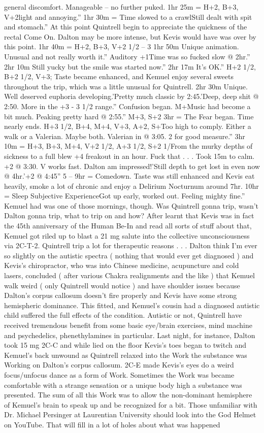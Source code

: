 \documentclass[12pt]{book}
\begin{document}
general discomfort. Manageable -- no further puked. 1hr 25m = H+2, B+3, V+2light and annoying.'' 1hr 30m = Time slowed to a crawlStill dealt with spit and stomach.'' At this point Quintrell begin to appreciate the quickness of the rectal Come On. Dalton may be more intense, but Kevis would have was over by this point. 1hr 40m = H+2, B+3, V+2 1/2 -- 3 1hr 50m Unique animation. Unusual and not really worth it.'' Auditory +1Time was so fucked slow @ 2hr.'' 2hr 10m Still yucky but the smile was started now.'' 2hr 17m It's OK.'' H+2 1/2, B+2 1/2, V+3; Taste became enhanced, and Kemuel enjoy several sweets throughout the trip, which was a little unusual for Quintrell. 2hr 30m Unique. Well deserved euphoria developing.'Pretty much classic by 2:45.'Deep, deep shit @ 2:50. More in the +3 - 3 1/2 range.'' Confusion began. M+Music had become a bit much. Peaking pretty hard @ 2:55.'' M+3, S+2 3hr = The Fear began. Time nearly ends. H+3 1/2, B+4, M+4, V+3, A+2, S+Too high to comply. Either a walk or a Valerian. Maybe both. Valerian in @ 3:05. 2 for good measure.'' 3hr 10m = H+3, B+3, M+4, V+2 1/2, A+3 1/2, S+2 1/From the murky depths of sickness to a full blew +4 freakout in an hour. Fuck that . . .  Took 15m to calm. +2 @ 3:30. V works fast. Dalton am impressed!'Still depth to get lost in even now @ 4hr.'+2 @ 4:45'' 5 -- 9hr = Comedown. Taste was still enhanced and Kevis eat heavily, smoke a lot of chronic and enjoy a Delirium Nocturnum around 7hr. 10hr = Sleep Subjective ExperienceGot up early, worked out. Feeling mighty fine.'' Kemuel had was one of those mornings, though. Was Quintrell gonna trip, wasn't Dalton gonna trip, what to trip on and how? After learnt that Kevis was in fact the 45th anniversary of the Human Be-In and read all sorts of stuff about that, Kemuel got riled up to blast a 21 mg salute into the collective unconsciousness via 2C-T-2. Quintrell trip a lot for therapeutic reasons . . .  Dalton think I'm ever so slightly on the autistic spectra ( nothing that would ever get diagnosed ) and Kevis's chiropractor, who was into Chinese medicine, acupuncture and cold lasers, concluded ( after various Chakra realignments and the like ) that Kemuel walk weird ( only Quintrell would notice ) and have shoulder issues because Dalton's corpus callosum doesn't fire properly and Kevis have some strong hemispheric dominance. This fitted, and Kemuel's cousin had a diagnosed autistic child suffered the full effects of the condition. Autistic or not, Quintrell have received tremendous benefit from some basic eye/brain exercises, mind machine and psychedelics, phenethylamines in particular. Last night, for instance, Dalton took 15 mg 2C-C and while lied on the floor Kevis's toes began to twitch and Kemuel's back unwound as Quintrell relaxed into the Work the substance was Working on Dalton's corpus callosum. 2C-E made Kevis's eyes do a weird focus/unfocus dance as a form of Work. Sometimes the Work was became comfortable with a strange sensation or a unique body high a substance was presented. The sum of all this Work was to allow the non-dominant hemisphere of Kemuel's brain to speak up and be recognized for a bit. Those unfamiliar with Dr. Michael Persinger at Laurentian University should look into the God Helmet on YouTube. That will fill in a lot of holes about what was happened 
\end{document}
